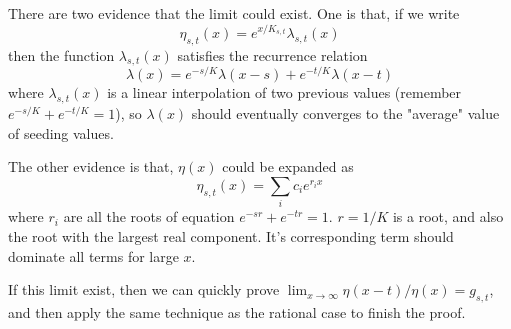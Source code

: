 \documentclass[]{article}
\begin{document}
There are two evidence that the limit could exist. One is that, if we write
\[
\eta_{s,t}(x) =  e^{x/K_{s,t}}\lambda_{s,t}(x)
\]
then the function $\lambda_{s,t}(x)$ satisfies the recurrence relation
\[
\lambda(x) = e^{-s/K} \lambda(x-s) + e^{-t/K} \lambda(x-t)
\]
where $\lambda_{s,t}(x)$ is a linear interpolation of two previous values (remember $e^{-s/K} + e^{-t/K} = 1$), so $\lambda(x)$ should eventually converges to the "average" value of seeding values.
	
The other evidence is that, $\eta(x)$ could be expanded as
\[
\eta_{s,t}(x) = \sum_{i} c_i e^{r_i x}
\]
where $r_i$ are all the roots of equation $e^{-sr} + e^{-tr} = 1$. $r = 1/K$ is a root, and also the root with the largest real component. It's corresponding term should dominate all terms for large $x$.

If this limit exist, then we can quickly prove $\lim_{x\to\infty} \eta(x-t)/\eta(x) = g_{s,t}$, and then apply the same technique as the rational case to finish the proof.
\end{document}
